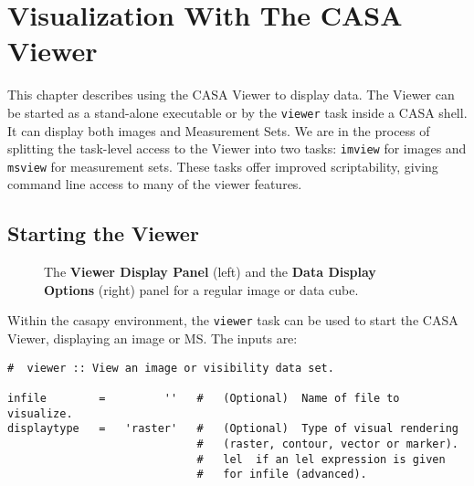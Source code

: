 

\chapter{Visualization With The CASA Viewer}
\label{chapter:display}

This chapter describes using the CASA Viewer to display data.
The Viewer can be started as a stand-alone executable or by the
{\tt viewer} task inside a CASA shell. It can display both images and Measurement Sets. 
We are in the process of splitting the task-level access to the Viewer into 
two tasks: {\tt imview} for images and {\tt msview} for measurement 
sets. These tasks offer improved scriptability, giving command
line access to many of the viewer features. 


\section{Starting the Viewer}
\label{section:display.start}

\begin{figure}[h!]
\begin{center}
\caption{\label{fig:viewer_start} The {\bf Viewer Display Panel} (left) and 
the {\bf Data Display Options} (right) panel for a regular image or data cube.}
\hrulefill
\end{center}
\end{figure}

Within the casapy environment, the {\tt viewer} task
can be used to start the CASA Viewer, displaying an image or MS.  The inputs are:
\small
\begin{verbatim}
#  viewer :: View an image or visibility data set.

infile        =         ''   #   (Optional)  Name of file to visualize.
displaytype   =   'raster'   #   (Optional)  Type of visual rendering
                             #   (raster, contour, vector or marker).
                             #   lel  if an lel expression is given
                             #   for infile (advanced).

\end{verbatim}
\normalsize

